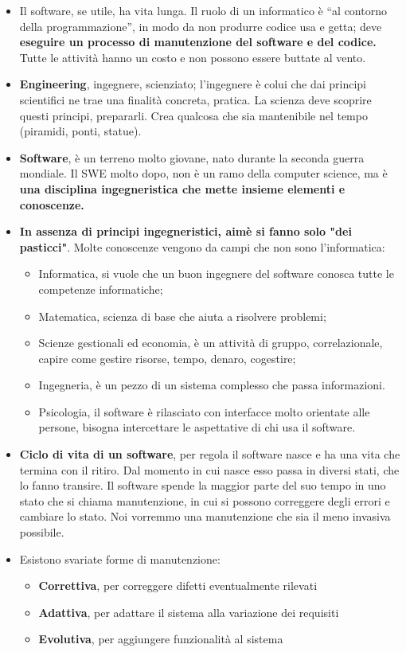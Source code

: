 \documentclass[a4paper,10pt] {article}
\begin{document}
\begin{itemize}
\item Il software, se utile, ha vita lunga. Il ruolo di un informatico è ``al
contorno della programmazione'', in modo da non produrre codice usa e getta; deve
\textbf{eseguire un processo di manutenzione del software e del codice.} Tutte le
attività hanno un costo e non possono essere buttate al vento.

\item \textbf{Engineering}, ingegnere, scienziato; l'ingegnere è colui che dai
principi scientifici ne trae una finalità concreta, pratica. La scienza deve
scoprire questi principi, prepararli. Crea qualcosa che sia mantenibile nel tempo
(piramidi, ponti, statue).
\item \textbf{Software}, è un terreno molto giovane, nato durante la seconda
guerra mondiale. Il SWE molto dopo, non è un ramo della computer science, ma
è \textbf{una disciplina ingegneristica che mette insieme elementi e
conoscenze.}
\item \textbf{In assenza di principi ingegneristici, aimè si fanno solo "dei
pasticci"}. Molte conoscenze vengono da campi che non sono l'informatica:
		\begin{itemize}
\item Informatica, si vuole che un buon ingegnere del software conosca tutte le
competenze informatiche;
		\item Matematica, scienza di base che aiuta a risolvere problemi;
\item Scienze gestionali ed economia, è un attività di gruppo, correlazionale,
capire come gestire risorse,
		tempo, denaro, cogestire;
		\item Ingegneria, è un pezzo di un sistema complesso che passa informazioni.
		\item Psicologia, il software è rilasciato con interfacce molto orientate alle
persone, bisogna intercettare le aspettative di chi usa il software.
		\end{itemize}

\item \textbf{Ciclo di vita di un software}, per regola il software nasce e ha
una vita che termina con il ritiro. Dal momento
in cui nasce esso passa in diversi stati, che lo fanno transire. Il software
spende la maggior parte del suo tempo
in uno stato che si chiama manutenzione, in cui si possono correggere degli errori
e cambiare lo stato. Noi
vorremmo una manutenzione che sia il meno invasiva possibile.
	\item Esistono svariate forme di manutenzione:
	\begin{itemize}
		\item \textbf{Correttiva}, per correggere difetti eventualmente rilevati
		\item \textbf{Adattiva}, per adattare il sistema alla variazione dei requisiti
		\item \textbf{Evolutiva}, per aggiungere funzionalità al sistema	


\end{itemize}
\end{itemize}
\end{document}
